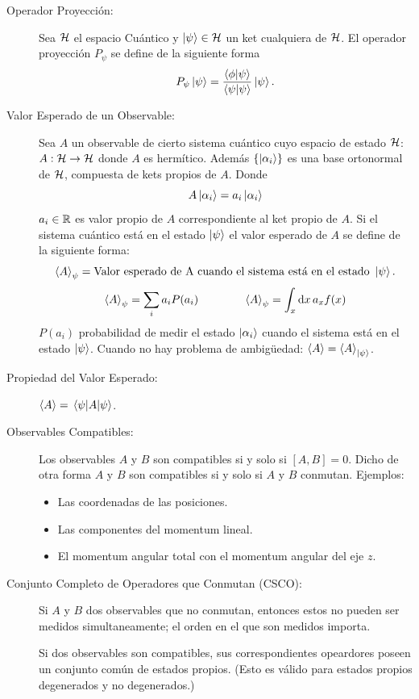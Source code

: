 \begin{description}
    \item[Operador Proyección: ] Sea $\mathcal{H}$ el espacio Cuántico y $\ket{\psi} \in \mathcal{H}$ un ket cualquiera de $\mathcal{H}$. El operador proyección $P_\psi$ se define de la siguiente forma
        $$ P_\psi \ket{\psi} = \frac{\braket{\phi}{\psi}}{\braket{\psi}} \ket{\psi} . $$ 
    \item[Valor Esperado de un Observable: ] Sea $A$ un observable de cierto sistema cuántico cuyo espacio de estado $\mathcal{H}$: $A:\mathcal{H} \to \mathcal{H}$ donde $A$ es hermítico. Además $\{ \ket{\alpha _i} \}$ es una base ortonormal de $\mathcal{H}$, compuesta de kets propios de $A$. Donde
        $$ A\ket{\alpha _i} = a_i \ket{\alpha _i} $$
    $a_i \in \mathbb{R}$ es valor propio de $A$ correspondiente al ket propio de $A$. Si el sistema cuántico está en el estado $\ket{\psi}$ el valor esperado de $A$ se define de la siguiente forma:
        $$ \expval{A} _\psi = \text{Valor esperado de A cuando el sistema está en el estado } \ket{\psi} . $$
        $$ \expval{A}_\psi = \sum_i a_i P(a_i) \qquad \qquad \expval{A}_\psi = \int _x \dd{x} a_x f(x) $$
    $P(a_i)$ probabilidad de medir el estado $\ket{\alpha _i}$ cuando el sistema está en el estado $\ket{\psi}$. Cuando no hay problema de ambigüedad:  $\expval{A} = \expval{A} _{\ket{\psi}}$.
    \item[Propiedad del Valor Esperado: ] $\expval{A} = \expval{A}{\psi}$.
    \item[Observables Compatibles: ] Los observables $A$ y $B$ son compatibles si y solo si $[A,B] = 0$. Dicho de otra forma $A$ y $B$ son compatibles si y solo si $A$ y $B$ conmutan. Ejemplos:
        \begin{itemize}
            \item Las coordenadas de las posiciones.
            \item Las componentes del momentum lineal.
            \item El momentum angular total con el momentum angular del eje $z$.
        \end{itemize}
	\item[Conjunto Completo de Operadores que Conmutan (CSCO): ] Si $A$ y $B$ dos observables que no conmutan, entonces estos no pueden ser medidos simultaneamente; el orden en el que son medidos importa.
	\begin{teorema}
		Si dos observables son compatibles, sus correspondientes opeardores poseen un conjunto común de estados propios. (Esto es válido para estados propios degenerados y no degenerados.)
	\end{teorema}

\end{description}
